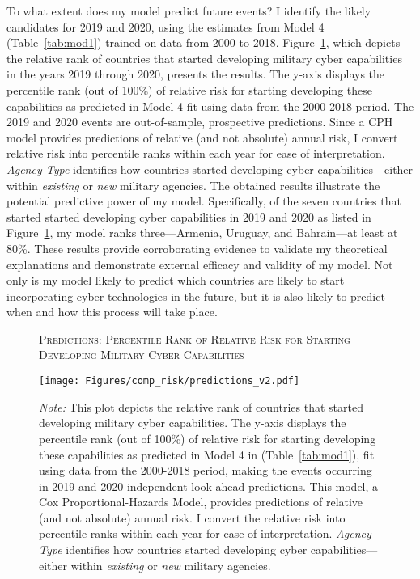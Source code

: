 \documentclass[12pt, letterpaper]{article}
\theoremstyle{plain}
\theoremstyle{remark}
\begin{document}
\noindent
To what extent does my model predict future events?
I identify the likely candidates for 2019 and 2020, using the estimates from Model 4 (Table~\ref{tab:mod1}) trained on data from 2000 to 2018.
Figure~\ref{fig:predictions}, which
depicts the relative rank of countries that started developing military cyber capabilities in the years 2019 through 2020, presents the results. 
The y-axis displays the percentile rank (out of 100\%) of relative risk for starting developing these capabilities as predicted in Model 4 fit using data from the 2000-2018 period.  
The 2019 and 2020 events  are out-of-sample, prospective predictions. 
Since a CPH model provides predictions of relative (and not absolute) annual risk, 
I convert relative risk into percentile ranks within each year for ease of interpretation.
\textit{Agency Type} identifies how countries started developing cyber capabilities---either within \textit{existing} or \textit{new} military agencies. 
The obtained results illustrate the potential predictive power of my model. 
Specifically, of the seven countries that started started developing cyber capabilities in 2019 and 2020 as listed in Figure~\ref{fig:predictions}, my model ranks three---Armenia, Uruguay, and Bahrain---at least at 80\%.
These results provide corroborating evidence to validate my theoretical explanations and demonstrate external efficacy and validity of my model. 
Not only is my model likely to predict which countries are likely to start incorporating cyber technologies in the future, but it is also likely to predict when and how this process will take place. 


\begin{figure}[ht]
	\centering
	\caption{\textsc{Predictions: Percentile Rank of Relative Risk for Starting Developing Military Cyber Capabilities}}
	\label{fig:predictions}
	\vspace{2mm}
	\centering
	\texttt{[image: Figures/comp\_risk/predictions\_v2.pdf]}
	\caption*{\scriptsize \textit{Note:} 
		This plot depicts the relative rank of countries that started developing military cyber capabilities. The y-axis displays the percentile rank (out of 100\%) of relative risk for starting developing these capabilities as predicted in Model 4 in (Table~\ref{tab:mod1}), fit using data from the 2000-2018 period, making the events occurring in 2019 and 2020 independent look-ahead predictions. This model, a Cox Proportional-Hazards Model, provides predictions of relative (and not absolute) annual risk.  I convert the relative risk into percentile ranks within each year for ease of interpretation. \textit{Agency Type} identifies how countries started developing cyber capabilities---either within \textit{existing} or \textit{new} military agencies.
			}
\end{figure}
\end{document}
